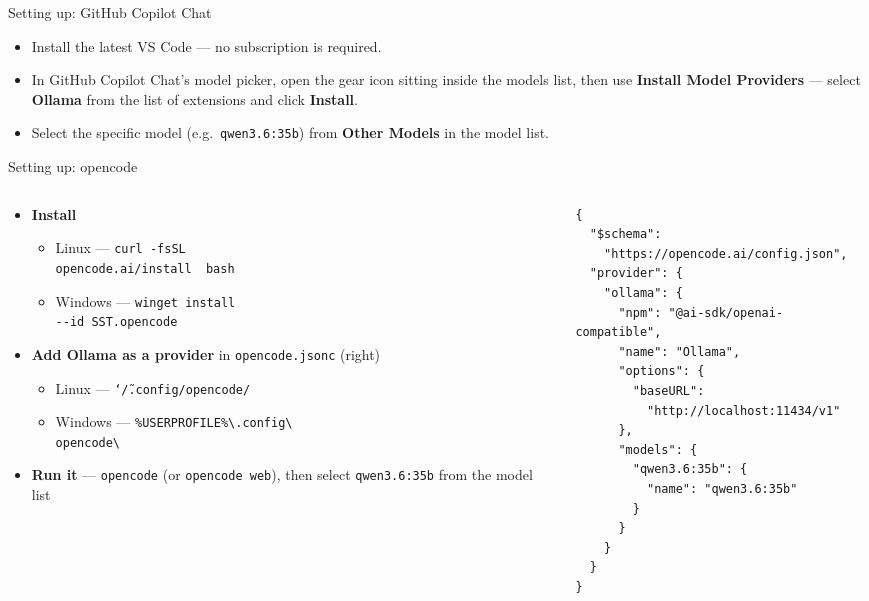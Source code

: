 \documentclass[aspectratio=169,10pt]{beamer}
\begin{document}
\begin{frame}{Setting up: GitHub Copilot Chat}
  \begin{itemize}
    \small
    \item Install the latest VS Code --- no subscription is required.
    \item In GitHub Copilot Chat's model picker, open the gear icon sitting
      inside
      the models list, then use \textbf{Install Model Providers} ---
      select \textbf{Ollama} from the list of extensions and click
      \textbf{Install}.
    \item Select the specific model (e.g.\ \texttt{qwen3.6:35b}) from
      \textbf{Other Models} in the model list.
  \end{itemize}
\end{frame}

\begin{frame}[fragile]{Setting up: opencode}
  \begin{columns}[T]
    \begin{column}{0.46\textwidth}
      \footnotesize
      \begin{itemize}
        \item \textbf{Install}
          \begin{itemize}
            \item Linux --- \texttt{curl -fsSL\\opencode.ai/install \textbar\ bash}
            \item Windows --- \texttt{winget install\\-{}-id SST.opencode}
          \end{itemize}
        \item \textbf{Add Ollama as a provider} in \texttt{opencode.jsonc}
          (right)
          \begin{itemize}
            \item Linux --- \texttt{\char`\~/.config/opencode/}
            \item Windows --- \texttt{\scriptsize\%USERPROFILE\%\textbackslash.config\textbackslash\\opencode\textbackslash}
          \end{itemize}
        \item \textbf{Run it} --- \texttt{opencode} (or \texttt{opencode
          web}), then select \texttt{qwen3.6:35b} from the model list
      \end{itemize}
    \end{column}
    \begin{column}{0.54\textwidth}
      \footnotesize
      \begin{verbatim}
{
  "$schema":
    "https://opencode.ai/config.json",
  "provider": {
    "ollama": {
      "npm": "@ai-sdk/openai-compatible",
      "name": "Ollama",
      "options": {
        "baseURL":
          "http://localhost:11434/v1"
      },
      "models": {
        "qwen3.6:35b": {
          "name": "qwen3.6:35b"
        }
      }
    }
  }
}
      \end{verbatim}
    \end{column}
  \end{columns}
\end{frame}
\end{document}
